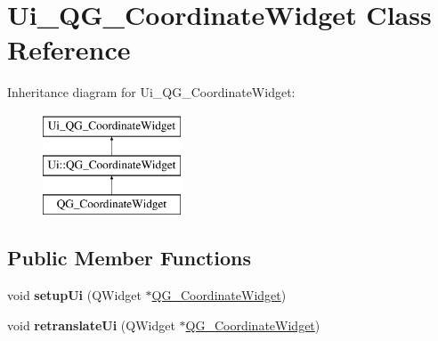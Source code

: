 \hypertarget{classUi__QG__CoordinateWidget}{\section{Ui\-\_\-\-Q\-G\-\_\-\-Coordinate\-Widget Class Reference}
\label{classUi__QG__CoordinateWidget}
}
Inheritance diagram for Ui\-\_\-\-Q\-G\-\_\-\-Coordinate\-Widget\-:\begin{figure}[H]
\begin{center}
\leavevmode
\includegraphics[height=3.000000cm]{classUi__QG__CoordinateWidget}
\end{center}
\end{figure}
\subsection*{Public Member Functions}
\begin{DoxyCompactItemize}
\item 
\hypertarget{classUi__QG__CoordinateWidget_ac8e24e75e4e329a07c824c221896bd74}{void {\bfseries setup\-Ui} (Q\-Widget $\ast$\hyperlink{classQG__CoordinateWidget}{Q\-G\-\_\-\-Coordinate\-Widget})}\label{classUi__QG__CoordinateWidget_ac8e24e75e4e329a07c824c221896bd74}

\item 
\hypertarget{classUi__QG__CoordinateWidget_a3f555b57b23942ee05aa8a8007cfc597}{void {\bfseries retranslate\-Ui} (Q\-Widget $\ast$\hyperlink{classQG__CoordinateWidget}{Q\-G\-\_\-\-Coordinate\-Widget})}\label{classUi__QG__CoordinateWidget_a3f555b57b23942ee05aa8a8007cfc597}

\end{DoxyCompactItemize}
